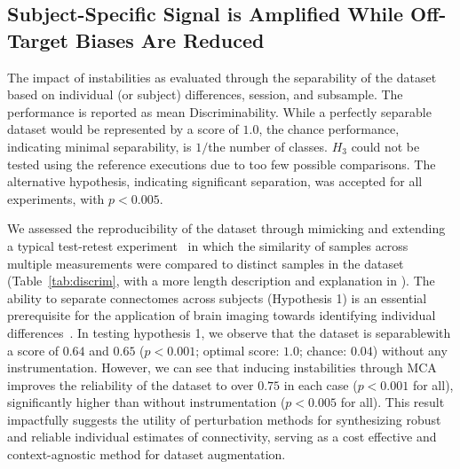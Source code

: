 \documentclass[fleqn,10pt]{SelfArx} %
\begin{document}
\subsection*{Subject-Specific Signal is Amplified While Off-Target Biases Are Reduced}
\begin{table}[ht]\centering
\caption{The impact of instabilities as evaluated through the separability of the dataset based on individual (or
subject) differences, session, and subsample. The performance is reported as mean Discriminability. While a perfectly
separable dataset would be represented by a score of $1.0$, the chance performance, indicating minimal separability, is
$1 /$the number of classes. $H_3$ could not be tested using the reference executions due to too few possible
comparisons. The alternative hypothesis, indicating significant separation, was accepted for all experiments, with
$p < 0.005$.}
\vspace{5pt}

\label{tab:discrim}
\end{table}

We assessed the reproducibility of the dataset through mimicking and extending a typical test-retest
experiment~\cite{bridgeford2020elim} in which the similarity of samples across multiple measurements were
compared to distinct samples in the dataset (Table~\ref{tab:discrim}, with a more length description and explanation in
). The ability to separate connectomes across subjects (Hypothesis 1) is an essential
prerequisite for the application of brain imaging towards identifying individual differences~\cite{Dubois2016-yr}. In
testing hypothesis 1, we observe that the dataset is separablewith a score of $0.64$ and $0.65$ ($p < 0.001$; optimal
score: $1.0$; chance: $0.04$) without any instrumentation. However, we can see that inducing instabilities through MCA
improves the reliability of the dataset to over $0.75$ in each case ($p < 0.001$ for all), significantly higher than
without instrumentation ($p < 0.005$ for all). This result impactfully suggests the utility of perturbation methods for
synthesizing robust and reliable individual estimates of connectivity, serving as a cost effective and context-agnostic
method for dataset augmentation.
\end{document}
